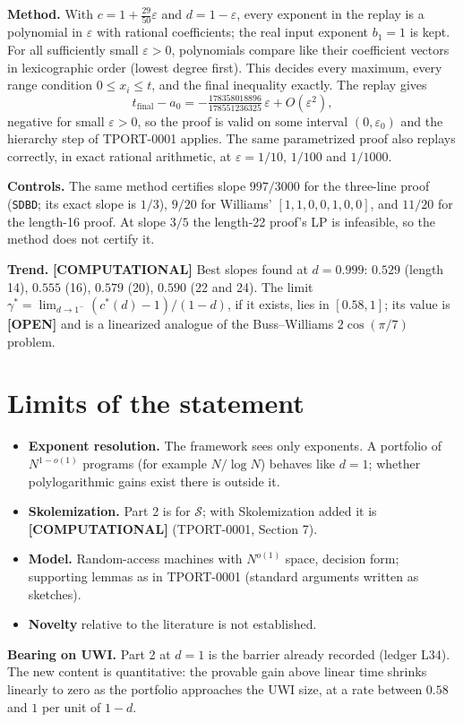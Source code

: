 \documentclass[11pt]{article}
\theoremstyle{remark}
\newcommand{\status}[1]{\textbf{[#1]}}
\begin{document}
\noindent\textbf{Method.} With $c=1+\tfrac{29}{50}\varepsilon$ and $d=1-\varepsilon$, every exponent in the
replay is a polynomial in $\varepsilon$ with rational coefficients; the real input exponent $b_1=1$ is kept.
For all sufficiently small $\varepsilon>0$, polynomials compare like their coefficient vectors in
lexicographic order (lowest degree first). This decides every maximum, every range condition
$0\le x_i\le t$, and the final inequality exactly. The replay gives
\[
t_{\text{final}}-a_0=-\tfrac{178358018896}{178551236325}\,\varepsilon+O(\varepsilon^2),
\]
negative for small $\varepsilon>0$, so the proof is valid on some interval $(0,\varepsilon_0)$ and the
hierarchy step of TPORT-0001 applies. The same parametrized proof also replays correctly, in exact
rational arithmetic, at $\varepsilon=1/10$, $1/100$ and $1/1000$.

\noindent\textbf{Controls.} The same method certifies slope $997/3000$ for the three-line proof
(\texttt{SDBD}; its exact slope is $1/3$), $9/20$ for Williams' $[1,1,0,0,1,0,0]$, and $11/20$ for the
length-16 proof. At slope $3/5$ the length-22 proof's LP is infeasible, so the method does not certify it.

\noindent\textbf{Trend.} \status{COMPUTATIONAL} Best slopes found at $d=0.999$: $0.529$ (length 14),
$0.555$ (16), $0.579$ (20), $0.590$ (22 and 24). The limit
$\gamma^*=\lim_{d\to1^-}(c^*(d)-1)/(1-d)$, if it exists, lies in $[0.58,1]$; its value is \status{OPEN} and is
a linearized analogue of the Buss--Williams $2\cos(\pi/7)$ problem.

\section{Limits of the statement}

\begin{itemize}
\item \textbf{Exponent resolution.} The framework sees only exponents. A portfolio of $N^{1-o(1)}$ programs
(for example $N/\log N$) behaves like $d=1$; whether polylogarithmic gains exist there is outside it.
\item \textbf{Skolemization.} Part 2 is for $\mathcal S$; with Skolemization added it is
\status{COMPUTATIONAL} (TPORT-0001, Section 7).
\item \textbf{Model.} Random-access machines with $N^{o(1)}$ space, decision form; supporting lemmas as in
TPORT-0001 (standard arguments written as sketches).
\item \textbf{Novelty} relative to the literature is not established.
\end{itemize}

\noindent\textbf{Bearing on UWI.} Part 2 at $d=1$ is the barrier already recorded (ledger L34). The new
content is quantitative: the provable gain above linear time shrinks linearly to zero as the portfolio
approaches the UWI size, at a rate between $0.58$ and $1$ per unit of $1-d$.
\end{document}
